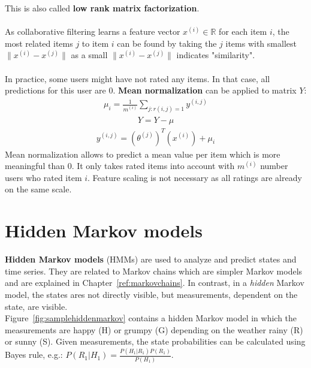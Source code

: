 \documentclass{report}
\begin{document}
This is also called {\bf low rank matrix factorization}.
\\
\\
As collaborative filtering learns a feature vector $x^{(i)}\in \mathbb{R}$ for each item $i$, the most related items $j$ to item $i$ can be found by taking the $j$ items with smallest $\lVert x^{(i)} - x^{(j)}\rVert$ as a small $\lVert x^{(i)} - x^{(j)}\rVert$ indicates "similarity".
\\
\\
In practice, some users might have not rated any items. In that case, all predictions for this user are $0$. {\bf Mean normalization} can be applied to matrix $Y$:
\begin{align*}
\mu_i = \frac{1}{m^{(i)}} \sum_{j:r(i,j)=1}y^{(i,j)}
\end{align*}
\begin{align*}
Y = Y - \mu
\end{align*}
\begin{align*}
y^{(i,j)}=(\theta^{(j)})^T(x^{(i)})+\mu_i
\end{align*}
Mean normalization allows to predict a mean value per item which is more meaningful than $0$. It only takes rated items into account with $m^{(i)}$ number users who rated item $i$. Feature scaling is not necessary as all ratings are already on the same scale.


\section{Hidden Markov models}
\label{section:HMM}
{\bf Hidden Markov models} (HMMs) are used to analyze and predict states and time series. They are related to Markov chains which are simpler Markov models and are explained in Chapter~\ref{ref:markovchains}. In contrast, in a {\em hidden} Markov model, the states ares not directly visible, but measurements, dependent on the state, are visible.
\\
Figure~\ref{fig:samplehiddenmarkov} contains a hidden Markov model in which the measurements are happy (H) or grumpy (G) depending on the weather rainy (R) or sunny (S). Given measurements, the state probabilities can be calculated using Bayes rule, e.g.: $P(R_1\vert H_1)=\frac{P(H_1\vert R_1)P(R_1)}{P(H_1)}$.
\end{document}
